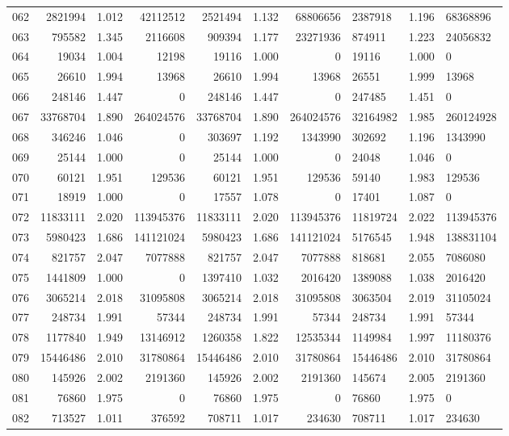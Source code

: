 \begin{longtable}{crrrrrr}
062 & 2821994 & 1.012 & 42112512 & 2521494 & 1.132 & 68806656 & 2387918 & 1.196 & 68368896 \\
063 & 795582 & 1.345 & 2116608 & 909394 & 1.177 & 23271936 & 874911 & 1.223 & 24056832 \\
064 & 19034 & 1.004 & 12198 & 19116 & 1.000 & 0 & 19116 & 1.000 & 0 \\
065 & 26610 & 1.994 & 13968 & 26610 & 1.994 & 13968 & 26551 & 1.999 & 13968 \\
066 & 248146 & 1.447 & 0 & 248146 & 1.447 & 0 & 247485 & 1.451 & 0 \\
067 & 33768704 & 1.890 & 264024576 & 33768704 & 1.890 & 264024576 & 32164982 & 1.985 & 260124928 \\
068 & 346246 & 1.046 & 0 & 303697 & 1.192 & 1343990 & 302692 & 1.196 & 1343990 \\
069 & 25144 & 1.000 & 0 & 25144 & 1.000 & 0 & 24048 & 1.046 & 0 \\
070 & 60121 & 1.951 & 129536 & 60121 & 1.951 & 129536 & 59140 & 1.983 & 129536 \\
071 & 18919 & 1.000 & 0 & 17557 & 1.078 & 0 & 17401 & 1.087 & 0 \\
072 & 11833111 & 2.020 & 113945376 & 11833111 & 2.020 & 113945376 & 11819724 & 2.022 & 113945376 \\
073 & 5980423 & 1.686 & 141121024 & 5980423 & 1.686 & 141121024 & 5176545 & 1.948 & 138831104 \\
074 & 821757 & 2.047 & 7077888 & 821757 & 2.047 & 7077888 & 818681 & 2.055 & 7086080 \\
075 & 1441809 & 1.000 & 0 & 1397410 & 1.032 & 2016420 & 1389088 & 1.038 & 2016420 \\
076 & 3065214 & 2.018 & 31095808 & 3065214 & 2.018 & 31095808 & 3063504 & 2.019 & 31105024 \\
077 & 248734 & 1.991 & 57344 & 248734 & 1.991 & 57344 & 248734 & 1.991 & 57344 \\
078 & 1177840 & 1.949 & 13146912 & 1260358 & 1.822 & 12535344 & 1149984 & 1.997 & 11180376 \\
079 & 15446486 & 2.010 & 31780864 & 15446486 & 2.010 & 31780864 & 15446486 & 2.010 & 31780864 \\
080 & 145926 & 2.002 & 2191360 & 145926 & 2.002 & 2191360 & 145674 & 2.005 & 2191360 \\
081 & 76860 & 1.975 & 0 & 76860 & 1.975 & 0 & 76860 & 1.975 & 0 \\
082 & 713527 & 1.011 & 376592 & 708711 & 1.017 & 234630 & 708711 & 1.017 & 234630 \\

\end{longtable}
